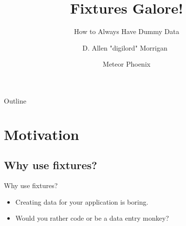 \documentclass{beamer}
\title[Fixtures Galore!] %
{Fixtures Galore!}
\subtitle
{How to Always Have Dummy Data}
\author[digilord] %
{D. Allen "digilord" Morrigan~\inst{1}}
\institute[Morsby Mechanical] %
{
  \inst{1}%
  Morsby Mechanical LLC, Tempe, AZ, USA, North America, Earth, Sol
}
\date[5 FEB 2015] %
{Meteor Phoenix}
\begin{document}
\begin{frame}
  \titlepage
\end{frame}

\begin{frame}{Outline}
  \tableofcontents
\end{frame}





\section{Motivation}

\subsection{Why use fixtures?}

\begin{frame}{Why use fixtures?} %

  \begin{itemize}
  \item
    Creating data for your application is boring.
  \item
    Would you rather code or be a data entry monkey?
  \end{itemize}
\end{frame}
\end{document}
